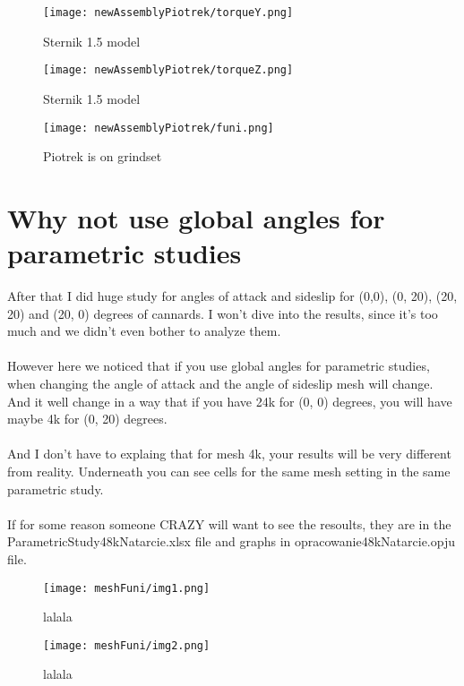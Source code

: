 \begin{figure}[H]
    \centering
    \texttt{[image: newAssemblyPiotrek/torqueY.png]}
    \caption{Sternik 1.5 model}
\end{figure}

\begin{figure}[H]
    \centering
    \texttt{[image: newAssemblyPiotrek/torqueZ.png]}
    \caption{Sternik 1.5 model}
\end{figure}

\begin{figure}[H]
    \centering
    \texttt{[image: newAssemblyPiotrek/funi.png]}
    \caption{Piotrek is on grindset}
\end{figure}
\newpage
\section{Why not use global angles for parametric studies}
After that I did huge study for  angles of attack and sideslip for (0,0), (0, 20), (20, 20) and 
(20, 0) degrees of cannards. I won't dive into the results, since it's too much and we didn't
even bother to analyze them. \\\\
However here we noticed that if you use global angles for parametric studies, when changing the
angle of attack and the angle of sideslip mesh will change. And it well change in a way that
if you have 24k for (0, 0) degrees, you will have maybe 4k for (0, 20) degrees. \\\\
And I don't have to explaing that for mesh 4k, your results will be very different from reality. 
Underneath you can see cells for the same mesh setting in the same parametric study.\\\\
If for some reason someone CRAZY will want to see the resoults, they are in the 
ParametricStudy48kNatarcie.xlsx file and graphs in opracowanie48kNatarcie.opju file.

\begin{figure}[H]
    \centering
    \texttt{[image: meshFuni/img1.png]}
    \caption{lalala}
\end{figure}

\begin{figure}[H]
    \centering
    \texttt{[image: meshFuni/img2.png]}
    \caption{lalala}
\end{figure}

